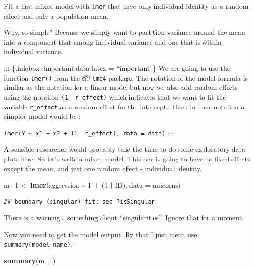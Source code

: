 \documentclass[
  12pt,
]{book}
\newenvironment{Shaded}{\begin{snugshade}}{\end{snugshade}}
\newcommand{\DataTypeTok}[1]{\textcolor[rgb]{0.13,0.29,0.53}{#1}}
\newcommand{\DecValTok}[1]{\textcolor[rgb]{0.00,0.00,0.81}{#1}}
\newcommand{\KeywordTok}[1]{\textcolor[rgb]{0.13,0.29,0.53}{\textbf{#1}}}
\newcommand{\NormalTok}[1]{#1}
\newcommand{\OperatorTok}[1]{\textcolor[rgb]{0.81,0.36,0.00}{\textbf{#1}}}
\newcommand{\StringTok}[1]{\textcolor[rgb]{0.31,0.60,0.02}{#1}}
\begin{document}
Fit a first mixed model with \texttt{lmer} that have only individual identity as a random effect and only a population mean.

Why, so simple? Because we simply want to partition variance around the mean into a component that among-individual variance and one that is within-individual variance.

::: \{.infobox .important data-latex = ``important''\}
We are going to use the function \texttt{lmer()} from the 📦 \texttt{lme4} package. The notation of the model formula is similar as the notation for a linear model but now we also add random effects using the notation \texttt{(1\ \textbar{}\ r\_effect)} which indicates that we want to fit the variable \texttt{r\_effect} as a random effect for the intercept. Thus, in lmer notation a simploe model would be :

\texttt{lmer(Y\ \textasciitilde{}\ x1\ +\ x2\ +\ (1\ \textbar{}\ r\_effect),\ data\ =\ data)}
:::

A sensible researcher would probably take the time to do some exploratory data plots here. So let's write a mixed model. This one is going to have no fixed effects except the mean, and just one random effect - individual identity.

\begin{Shaded}
\begin{Highlighting}[]
\NormalTok{m\_}\DecValTok{1}\NormalTok{ \textless{}{-}}\StringTok{ }\KeywordTok{lmer}\NormalTok{(aggression }\OperatorTok{\textasciitilde{}}\StringTok{ }\DecValTok{1} \OperatorTok{+}\StringTok{ }\NormalTok{(}\DecValTok{1} \OperatorTok{|}\StringTok{ }\NormalTok{ID), }\DataTypeTok{data =}\NormalTok{ unicorns)}
\end{Highlighting}
\end{Shaded}

\begin{verbatim}
## boundary (singular) fit: see ?isSingular
\end{verbatim}

There is a warning\ldots{} something about ``singularities''. Ignore that for a moment.

Now you need to get the model output. By that I just mean use \texttt{summary(model\_name)}.

\begin{Shaded}
\begin{Highlighting}[]
\KeywordTok{summary}\NormalTok{(m\_}\DecValTok{1}\NormalTok{)}
\end{Highlighting}
\end{Shaded}
\end{document}
